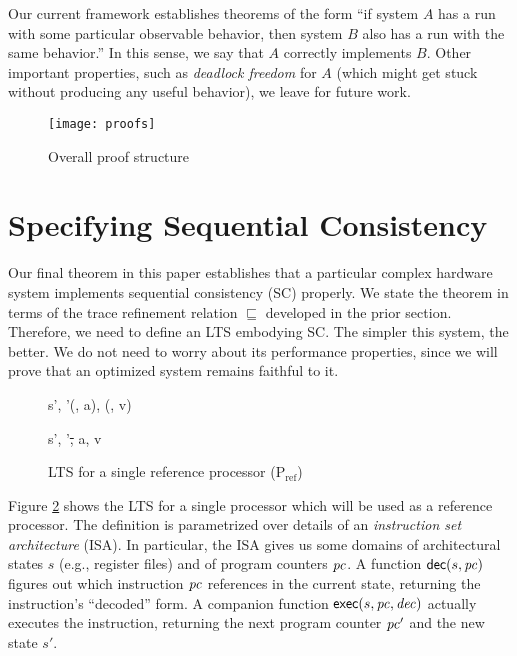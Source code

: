 Our current framework establishes theorems of the form ``if system $A$ has a run
with some particular observable behavior, then system $B$ also has a run with
the same behavior.''  In this sense, we say that $A$ correctly implements $B$.
Other important properties, such as \emph{deadlock freedom} for $A$ (which
might get stuck without producing any useful behavior), we leave for future
work.

\begin{figure}
\texttt{[image: proofs]}
\caption{Overall proof structure}
\label{proofs}
\end{figure}

\section{Specifying Sequential Consistency}\label{sec:sc}

Our final theorem in this paper establishes that a particular complex hardware
system implements sequential consistency (SC) properly.  We state the theorem
in terms of the trace refinement relation $\sqsubseteq$ developed in the prior
section.  Therefore, we need to define an LTS embodying SC.  The simpler this
system, the better.  We do not need to worry about its performance properties,
since we will prove that an optimized system remains faithful to it.

\begin{figure}
\centering
\begin{boxedminipage}[c]{.48\textwidth}
{}

{}

{
{s', \pc'}{(\ld\req, a), (\ld\resp, v)}}

{
{s', \pc'}{\st, a, v}}
\end{boxedminipage}

\caption{LTS for a single reference processor (P$_{\text{ref}}$)}
\label{Pref$}
\end{figure}


Figure \ref{Pref$} shows the LTS for a single processor which will be used as a
reference processor.  The definition is parametrized over details of an
\emph{instruction set architecture} (ISA).  In particular, the ISA gives us
some domains of architectural states $s$ (e.g., register files) and of program
counters $\pc$.  A function $\dec(s, \pc)$ figures out which instruction $\pc$
references in the current state, returning the instruction's ``decoded'' form.
A companion function $\exec(s, \pc, \mathit{dec})$ actually executes the
instruction, returning the next program counter $\pc'$ and the new state $s'$.

